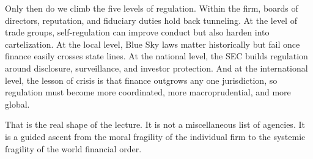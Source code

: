 Only then do we climb the five levels of regulation. Within the firm, boards of directors, reputation, and fiduciary duties hold back tunneling. At the level of trade groups, self-regulation can improve conduct but also harden into cartelization. At the local level, Blue Sky laws matter historically but fail once finance easily crosses state lines. At the national level, the SEC builds regulation around disclosure, surveillance, and investor protection. And at the international level, the lesson of crisis is that finance outgrows any one jurisdiction, so regulation must become more coordinated, more macroprudential, and more global.

That is the real shape of the lecture. It is not a miscellaneous list of agencies. It is a guided ascent from the moral fragility of the individual firm to the systemic fragility of the world financial order.